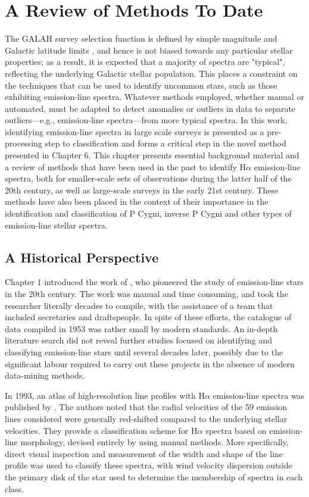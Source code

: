 \chapter{A Review of Methods To Date}

The GALAH survey selection function is defined by simple magnitude and Galactic latitude limits \citep{Martell+2017}, and hence is not biased towards any particular stellar properties; as a result, it is expected that a majority of spectra are "typical", reflecting the underlying Galactic stellar population. This places a constraint on the techniques that can be used to identify uncommon stars, such as those exhibiting emission-line spectra. Whatever methods employed, whether manual or automated, must be adapted to detect anomalies or outliers in data to separate outliers—e.g., emission-line spectra—from more typical spectra. In this work, identifying emission-line spectra in large scale surveys is presented as a pre-processing step to classification and forms a critical step in the novel method presented in Chapter 6. This chapter presents essential background material and a review of methods that have been used in the past to identify H$\alpha$ emission-line spectra, both for smaller-scale sets of observations during the latter half of the 20th century, as well as large-scale surveys in the early 21st century. These methods have also been placed in the context of their importance in the identification and classification of P Cygni, inverse P Cygni and other types of emission-line stellar spectra.

\section{A Historical Perspective}
Chapter 1 introduced the work of \citet{1953PDAO....9....1B}, who pioneered the study of emission-line stars in the 20th century. The work was manual and time consuming, and took the researcher literally decades to compile, with the assistance of a team that included secretaries and draftspeople. In spite of these efforts, the catalogue of data compiled in 1953 was rather small by modern standards. An in-depth literature search did not reveal further studies focused on identifying and classifying emission-line stars until several decades later, possibly due to the significant labour required to carry out these projects in the absence of modern data-mining methods. 

In 1993, an atlas of high-resolution line profiles with H$\alpha$ emission-line spectra was published by \citet{van1993atlas}. The authors noted that the radial velocities of the 59 emission lines considered were generally red-shifted compared to the underlying stellar velocities. They provide a classification scheme for H$\alpha$ spectra based on emission-line morphology, devised entirely by using manual methods. More specifically, direct visual inspection and measurement of the width and shape of the line profile was used to classify these spectra, with wind velocity dispersion outside the primary disk of the star used to determine the membership of spectra in each class.

